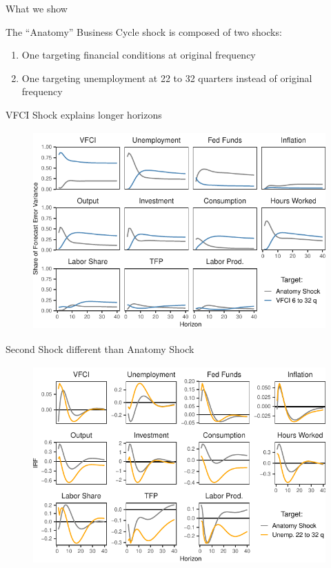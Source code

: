 \begin{frame}{What we show}

    The ``Anatomy'' Business Cycle shock is composed of two shocks:
    \vspace{0.25cm}
    \begin{enumerate}
        \item One targeting financial conditions at original frequency
        \vspace{0.25cm}
        \item One targeting unemployment at 22 to 32 quarters instead of original frequency
    \end{enumerate} 
\end{frame}


\begin{frame}{VFCI Shock explains longer horizons}

    \begin{figure}
        \includegraphics[height = 3in]{figs/fig4_fevd.pdf}
    \end{figure}

\end{frame}

\begin{frame}{Second Shock different than Anatomy Shock}

    \begin{figure}
        \includegraphics[height = 3in]{figs/fig6_irf_u0632_u2232.pdf}
    \end{figure}

\end{frame}


